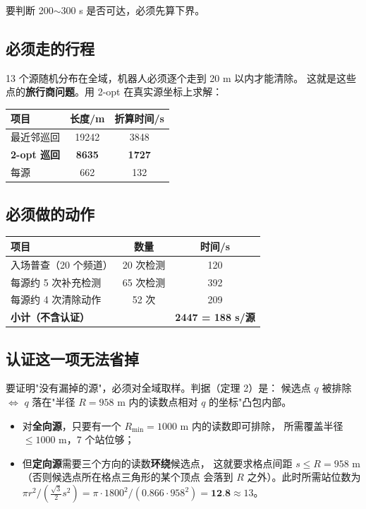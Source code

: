 要判断 200$\sim$300 s 是否可达，必须先算下界。

\subsection{必须走的行程}

13 个源随机分布在全域，机器人必须逐个走到 20 m 以内才能清除。
这就是这些点的\textbf{旅行商问题}。用 2-opt 在真实源坐标上求解：

\begin{center}
\begin{tabular}{lcc}
\toprule
项目 & 长度/m & 折算时间/s \\ \midrule
最近邻巡回 & 19242 & 3848 \\
\textbf{2-opt 巡回} & \textbf{8635} & \textbf{1727} \\
每源 & 662 & 132 \\
\bottomrule
\end{tabular}
\end{center}

\subsection{必须做的动作}

\begin{center}
\begin{tabular}{lcc}
\toprule
项目 & 数量 & 时间/s \\ \midrule
入场普查（20 个频道） & 20 次检测 & 120 \\
每源约 5 次补充检测 & 65 次检测 & 392 \\
每源约 4 次清除动作 & 52 次 & 209 \\
\midrule
\textbf{小计（不含认证）} & & \textbf{2447 = 188 s/源} \\
\bottomrule
\end{tabular}
\end{center}

\subsection{认证这一项无法省掉}

要证明"没有漏掉的源"，必须对全域取样。判据（定理 2）是：
候选点 $q$ 被排除 $\iff$ $q$ 落在"半径 $R=958$ m 内的读数点相对 $q$ 的坐标"凸包内部。

\begin{itemize}[leftmargin=1.8em]
  \item 对\textbf{全向源}，只要有一个 $R_{\min}=1000$ m 内的读数即可排除，
        所需覆盖半径 $\le1000$ m，7 个站位够；
  \item 但\textbf{定向源}需要三个方向的读数\textbf{环绕}候选点，
        这就要求格点间距 $s\le R=958$ m（否则候选点所在格点三角形的某个顶点
        会落到 $R$ 之外）。此时所需站位数为
        $\pi r^2/(\frac{\sqrt3}{2}s^2)=\pi\cdot1800^2/(0.866\cdot958^2)=\textbf{12.8}\approx13$。
\end{itemize}

